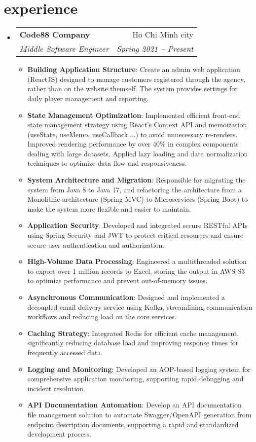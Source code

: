 \documentclass[letterpaper,10pt]{article}
\makeatletter
\newcommand{\resumeItem}[2]{
    \item\small{
        \textbf{#1}{: #2 \vspace{2pt}}
    }
}
\newcommand{\resumeSubheading}[4]{
  \vspace{-1pt}\item
    \begin{tabular*}{0.97\textwidth}[t]{l@{\extracolsep{\fill}}r}
      \vspace{5pt}
      \textbf{#1} & #2 \\
      \vspace{5pt}
      \textit{\small#3} & \textit{\small #4} \\
    \end{tabular*}\vspace{-5pt}
}
\newcommand{\resumeSubHeadingListStart}{\begin{itemize}[leftmargin=*]}
\newcommand{\resumeSubHeadingListEnd}{\end{itemize}}
\newcommand{\resumeItemListStart}{\begin{itemize}[leftmargin=*, itemsep=6pt]}
\newcommand{\resumeItemListEnd}{\end{itemize}\vspace{-5pt}}
\makeatother
\begin{document}
\section{experience}\vspace{-4pt}
    \resumeSubHeadingListStart
        \resumeSubheading
            {Code88 Company}{Ho Chi Minh city}
            {Middle Software Engineer}{Spring 2021 -- Present}
        \resumeItemListStart
            \resumeItem{Building Application Structure}
                {Create an admin web application (ReactJS) designed to manage customers registered through the agency, rather than on the website themself. The system provides settings for daily player management and reporting.}
            \resumeItem{State Management Optimization}
                {Implemented efficient front-end state management strategy using React’s Context API and memoization (useState, useMemo, useCallback,...) to avoid unnecessary re-renders. Improved rendering performance by over 40\% in complex components dealing with large datasets. Applied lazy loading and data normalization techniques to optimize data flow and responsiveness.}
            \resumeItem{System Architecture and Migration}
                {Responsible for migrating the system from Java 8 to Java 17, and refactoring the architecture from a Monolithic architecture (Spring MVC) to Microservices (Spring Boot) to make the system more flexible and easier to maintain.}
            \resumeItem{Application Security}
                {Developed and integrated secure RESTful APIs using Spring Security and JWT to protect critical resources and ensure secure user authentication and authorization.}
            \resumeItem{High-Volume Data Processing}
                {Engineered a multithreaded solution to export over 1 million records to Excel, storing the output in AWS S3 to optimize performance and prevent out-of-memory issues.}
            \resumeItem{Asynchronous Communication}
                {Designed and implemented a decoupled email delivery service using Kafka, streamlining communication workflows and reducing load on the core services.}
            \resumeItem{Caching Strategy}
                {Integrated Redis for efficient cache management, significantly reducing database load and improving response times for frequently accessed data.}
            \resumeItem{Logging and Monitoring}
                {Developed an AOP-based logging system for comprehensive application monitoring, supporting rapid debugging and incident resolution.}
            \resumeItem{API Documentation Automation}
                {Develop an API documentation file management solution to automate Swagger/OpenAPI generation from endpoint description documents, supporting a rapid and standardized development process.}
        \resumeItemListEnd
    \resumeSubHeadingListEnd
\end{document}
